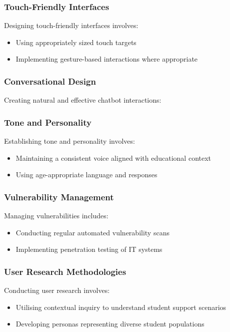 \documentclass[14pt,a4paper]{article}
\begin{document}
\begin{multicols}{2}
\subsubsection*{Touch-Friendly Interfaces}
Designing touch-friendly interfaces \textit{\parencite[pp. 80-120]{HooberBerkman2023}} involves:
\begin{itemize}
    \item Using appropriately sized touch targets
    \item Implementing gesture-based interactions where appropriate
\end{itemize}

\subsubsection{Conversational Design}
Creating natural and effective chatbot interactions:


\subsubsection*{Tone and Personality}
Establishing tone and personality \textit{\parencite[pp. 20-50]{Bradbury2024}} involves:
\begin{itemize}
    \item Maintaining a consistent voice aligned with educational context
    \item Using age-appropriate language and responses
\end{itemize}



\subsubsection*{Vulnerability Management}
Managing vulnerabilities \textit{\parencite[pp. 150-200]{StuttardPinto2023}} includes:
\begin{itemize}
    \item Conducting regular automated vulnerability scans
    \item Implementing penetration testing of IT systems
\end{itemize}


\subsubsection{User Research Methodologies}
Conducting user research \textit{\parencite[pp. 50-100]{Goodman2023}} involves:
\begin{itemize}
    \item Utilising contextual inquiry to understand student support scenarios
    \item Developing personas representing diverse student populations
\end{itemize}


\end{multicols}
\end{document}
